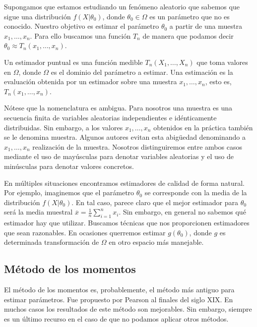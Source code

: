 \documentclass{article}
\begin{document}
Supongamos que estamos estudiando un fenómeno aleatorio que sabemos que sigue una distribución $f(X | \theta_0)$, donde $\theta_0 \in \Omega$ es un parámetro que no es conocido. Nuestro objetivo es estimar el parámetro $\theta_0$ a partir de una muestra $x_1, \ldots, x_n$. Para ello buscamos una función $T_n$ de manera que podamos decir $\theta_0 \approx T_n(x_1, \ldots, x_n)$.

\begin{definition}
    Un estimador puntual es una función medible $T_n(X_1, \ldots, X_n)$ que toma valores en $\Omega$, donde $\Omega$ es el dominio del parámetro a estimar. Una estimación es la evaluación obtenida por un estimador sobre una muestra $x_1, \ldots, x_n$, esto es, $T_n(x_1, \ldots, x_n)$.
\end{definition}

Nótese que la nomenclatura es ambigua. Para nosotros una muestra es una secuencia finita de variables aleatorias independientes e idénticamente distribuidas. Sin embargo, a los valores $x_1, \ldots, x_n$ obtenidos en la práctica también se le denomina muestra. Algunos autores evitan esta abigüedad denominando a $x_1, \ldots, x_n$ realización de la muestra. Nosotros distinguiremos entre ambos casos mediante el uso de mayúsculas para denotar variables aleatorias y el uso de minúsculas para denotar valores concretos.

En múltiples situaciones encontramos estimadores de calidad de forma natural. Por ejemplo, imaginemos que el parámetro $\theta_0$ se corresponde con la media de la distribución $f(X | \theta_0)$. En tal caso, parece claro que el mejor estimador para $\theta_0$ será la media muestral $\overline{x} = \frac{1}{n}\sum_{i = 1}^n x_i$. Sin embargo, en general no sabemos qué estimador hay que utilizar. Buscamos técnicas que nos proporcionen estimadores que sean razonables. En ocasiones querremos estimar $g(\theta_0)$, donde $g$ es determinada transformación de $\Omega$ en otro espacio más manejable.

\subsection{Método de los momentos}

El método de los momentos es, probablemente, el método más antiguo para estimar parámetros. Fue propuesto por Pearson al finales del siglo XIX. En muchos casos los resultados de este método son mejorables. Sin embargo, siempre es un último recurso en el caso de que no podamos aplicar otros métodos.
\end{document}
